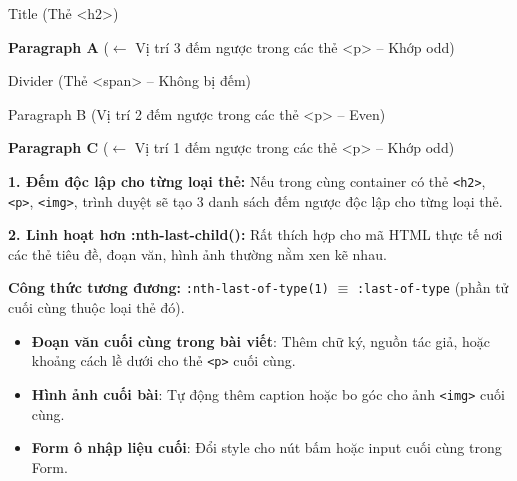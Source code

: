 \documentclass[11pt,oneside]{book}
\newcommand{\codeinline}[1]{\textcolor{accentOrange}{\texttt{#1}}}
\begin{document}
\begin{browserWindow}
\sffamily\small
Title {\scriptsize\textcolor{gray!60}{(Thẻ <h2>)}} \par\vspace{2pt}
\colorbox{yellow!20}{\textbf{Paragraph A}} {\scriptsize\textcolor{gray!60}{($\leftarrow$ Vị trí 3 đếm ngược trong các thẻ <p> -- Khớp odd)}} \par\vspace{2pt}
Divider {\scriptsize\textcolor{gray!60}{(Thẻ <span> -- Không bị đếm)}} \par\vspace{2pt}
Paragraph B {\scriptsize\textcolor{gray!60}{(Vị trí 2 đếm ngược trong các thẻ <p> -- Even)}} \par\vspace{2pt}
\colorbox{yellow!20}{\textbf{Paragraph C}} {\scriptsize\textcolor{gray!60}{($\leftarrow$ Vị trí 1 đếm ngược trong các thẻ <p> -- Khớp odd)}}
\end{browserWindow}

\begin{warnBox}
\textbf{1. Đếm độc lập cho từng loại thẻ:} Nếu trong cùng container có thẻ \codeinline{<h2>}, \codeinline{<p>}, \codeinline{<img>}, trình duyệt sẽ tạo 3 danh sách đếm ngược độc lập cho từng loại thẻ.
\par\vspace{4pt}
\textbf{2. Linh hoạt hơn :nth-last-child():} Rất thích hợp cho mã HTML thực tế nơi các thẻ tiêu đề, đoạn văn, hình ảnh thường nằm xen kẽ nhau.
\end{warnBox}

\begin{tipBox}
\textbf{Công thức tương đương:} \codeinline{:nth-last-of-type(1)} $\equiv$ \codeinline{:last-of-type} (phần tử cuối cùng thuộc loại thẻ đó).
\end{tipBox}

\begin{conceptBox}
\begin{itemize}[leftmargin=1.5em, itemsep=3pt, parsep=0pt]
    \item \textbf{Đoạn văn cuối cùng trong bài viết}: Thêm chữ ký, nguồn tác giả, hoặc khoảng cách lề dưới cho thẻ \codeinline{<p>} cuối cùng.
    \item \textbf{Hình ảnh cuối bài}: Tự động thêm caption hoặc bo góc cho ảnh \codeinline{<img>} cuối cùng.
    \item \textbf{Form ô nhập liệu cuối}: Đổi style cho nút bấm hoặc input cuối cùng trong Form.
\end{itemize}
\end{conceptBox}
\end{document}
